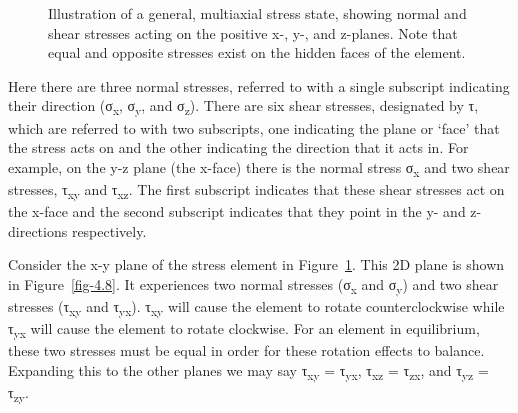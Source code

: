 \documentclass[
  letterpaper,
  DIV=11,
  numbers=noendperiod]{scrreprt}
\theoremstyle{definition}
\theoremstyle{remark}
\begin{document}
\begin{figure}


\caption{\label{fig-4.7}Illustration of a general, multiaxial stress
state, showing normal and shear stresses acting on the positive x-, y-,
and z-planes. Note that equal and opposite stresses exist on the hidden
faces of the element.}

\end{figure}%

Here there are three normal stresses, referred to with a single
subscript indicating their direction (σ\textsubscript{x},
σ\textsubscript{y}, and σ\textsubscript{z}). There are six shear
stresses, designated by τ, which are referred to with two subscripts,
one indicating the plane or `face' that the stress acts on and the other
indicating the direction that it acts in. For example, on the y-z plane
(the x-face) there is the normal stress σ\textsubscript{x} and two shear
stresses, τ\textsubscript{xy} and τ\textsubscript{xz}. The first
subscript indicates that these shear stresses act on the x-face and the
second subscript indicates that they point in the y- and z-directions
respectively.

Consider the x-y plane of the stress element in Figure~\ref{fig-4.7}.
This 2D plane is shown in Figure~\ref{fig-4.8}. It experiences two
normal stresses (σ\textsubscript{x} and σ\textsubscript{y}) and two
shear stresses (τ\textsubscript{xy} and τ\textsubscript{yx}).
τ\textsubscript{xy} will cause the element to rotate counterclockwise
while τ\textsubscript{yx} will cause the element to rotate clockwise.
For an element in equilibrium, these two stresses must be equal in order
for these rotation effects to balance. Expanding this to the other
planes we may say τ\textsubscript{xy} = τ\textsubscript{yx},
τ\textsubscript{xz} = τ\textsubscript{zx}, and τ\textsubscript{yz} =
τ\textsubscript{zy}.
\end{document}
